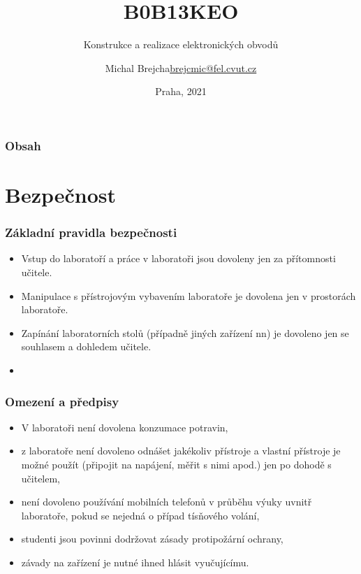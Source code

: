 \documentclass{beamer}
\title[B0B13KEO]{B0B13KEO}
\subtitle[KEO] {Konstrukce a realizace elektronických obvodů}
\author[Brejcha]{\texorpdfstring{Michal Brejcha\newline\url{brejcmic@fel.cvut.cz}}{Michal Brejcha}}
\institute[ČVUT]{ČVUT v Praze, FEL}
\date[Praha, 2021]{Praha, 2021}
\begin{document}
\frame{\titlepage}

\begin{frame}
\frametitle{Obsah} 
\tableofcontents
\end{frame}


\section{\texorpdfstring{Bezpečnost}{Bezpecnost}}
	\begin{frame}
    \frametitle{Základní pravidla bezpečnosti}
		\begin{itemize}
		\item Vstup do laboratoří a práce v laboratoři jsou dovoleny jen za přítomnosti učitele.
		\item Manipulace s přístrojovým vybavením laboratoře je dovolena jen v prostorách laboratoře.
		\item Zapínání laboratorních stolů (případně jiných zařízení nn) je dovoleno jen se souhlasem a dohledem učitele.
		\item \textbf{}
		\end{itemize}
	\end{frame}
	\begin{frame}
    \frametitle{Omezení a předpisy}
		\begin{itemize}
		\item V laboratoři není dovolena konzumace potravin,
    \item z laboratoře není dovoleno odnášet jakékoliv přístroje a vlastní přístroje je možné použít (připojit na napájení, měřit s nimi apod.) jen po dohodě s učitelem,
		\item není dovoleno používání mobilních telefonů v průběhu výuky uvnitř laboratoře, pokud se nejedná o případ tísňového volání,
		\item studenti jsou povinni dodržovat zásady protipožární ochrany,
		\item závady na zařízení je nutné ihned hlásit vyučujícímu.
		\end{itemize}
	\end{frame}
\end{document}
